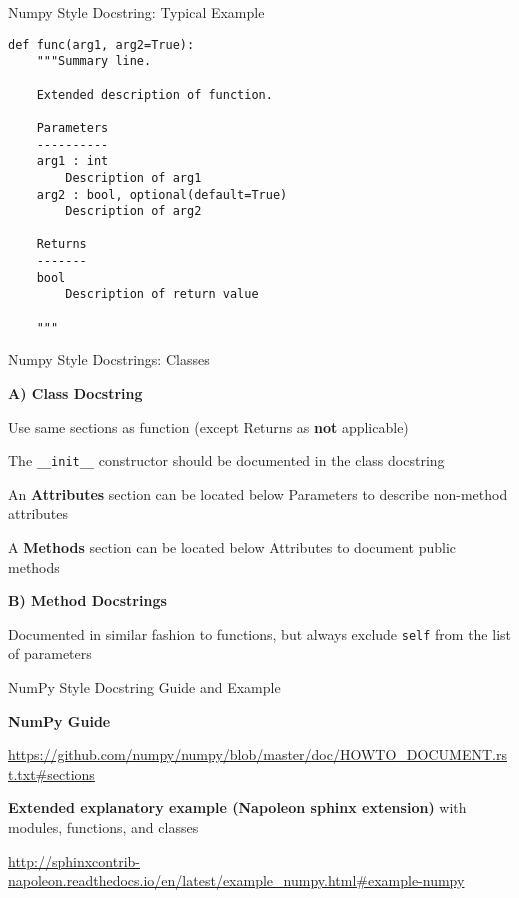 \documentclass{beamer}
\begin{document}
\begin{frame}[fragile]{Numpy Style Docstring: Typical Example}

\begin{verbatim}
def func(arg1, arg2=True):
    """Summary line.

    Extended description of function.

    Parameters
    ----------
    arg1 : int
        Description of arg1
    arg2 : bool, optional(default=True)
        Description of arg2

    Returns
    -------
    bool
        Description of return value

    """
\end{verbatim}

\end{frame}

\begin{frame}[fragile]{Numpy Style Docstrings: Classes}

\textbf{A) Class Docstring}

Use same sections as function (except Returns as \textbf{not} applicable)

The \texttt{__init__} constructor should be documented in the class docstring

An \textbf{Attributes} section can be located below Parameters to describe non-method attributes

A \textbf{Methods} section can be located below Attributes to document public methods

\textbf{B) Method Docstrings}

Documented in similar fashion to functions, but always exclude \texttt{self} from the list of parameters

\end{frame}

\begin{frame}{NumPy Style Docstring Guide and Example}

\textbf{NumPy Guide}

\url{https://github.com/numpy/numpy/blob/master/doc/HOWTO_DOCUMENT.rst.txt\#sections}

\textbf{Extended explanatory example (Napoleon sphinx extension)} with modules, functions, and classes  

\url{http://sphinxcontrib-napoleon.readthedocs.io/en/latest/example_numpy.html\#example-numpy}

\end{frame}
\end{document}
